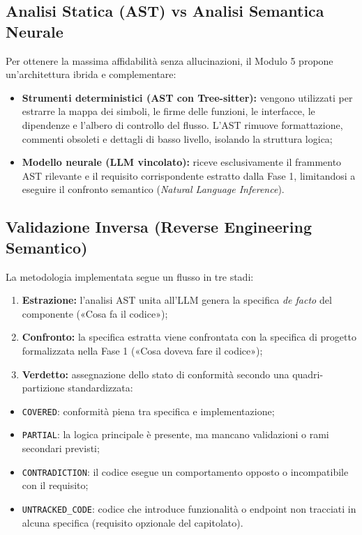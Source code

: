 \documentclass[a4paper, 11pt]{article}
\begin{document}
\subsection{Analisi Statica (AST) vs Analisi Semantica Neurale}
Per ottenere la massima affidabilità senza allucinazioni, il Modulo 5 propone un'architettura ibrida e complementare:

\begin{itemize}
    \item \textbf{Strumenti deterministici (AST con Tree-sitter):} vengono utilizzati per estrarre la mappa dei simboli, le firme delle funzioni, le interfacce, le dipendenze e l'albero di controllo del flusso. L'AST rimuove formattazione, commenti obsoleti e dettagli di basso livello, isolando la struttura logica;
    \item \textbf{Modello neurale (LLM vincolato):} riceve esclusivamente il frammento AST rilevante e il requisito corrispondente estratto dalla Fase 1, limitandosi a eseguire il confronto semantico (\textit{Natural Language Inference}).
\end{itemize}

\subsection{Validazione Inversa (Reverse Engineering Semantico)}
La metodologia implementata segue un flusso in tre stadi:

\begin{enumerate}
    \item \textbf{Estrazione:} l'analisi AST unita all'LLM genera la specifica \textit{de facto} del componente («Cosa fa il codice»);
    \item \textbf{Confronto:} la specifica estratta viene confrontata con la specifica di progetto formalizzata nella Fase 1 («Cosa doveva fare il codice»);
    \item \textbf{Verdetto:} assegnazione dello stato di conformità secondo una quadri-partizione standardizzata:
\end{enumerate}

\begin{itemize}
    \item \texttt{COVERED}: conformità piena tra specifica e implementazione;
    \item \texttt{PARTIAL}: la logica principale è presente, ma mancano validazioni o rami secondari previsti;
    \item \texttt{CONTRADICTION}: il codice esegue un comportamento opposto o incompatibile con il requisito;
    \item \texttt{UNTRACKED\_CODE}: codice che introduce funzionalità o endpoint non tracciati in alcuna specifica (requisito opzionale del capitolato).
\end{itemize}
\end{document}
